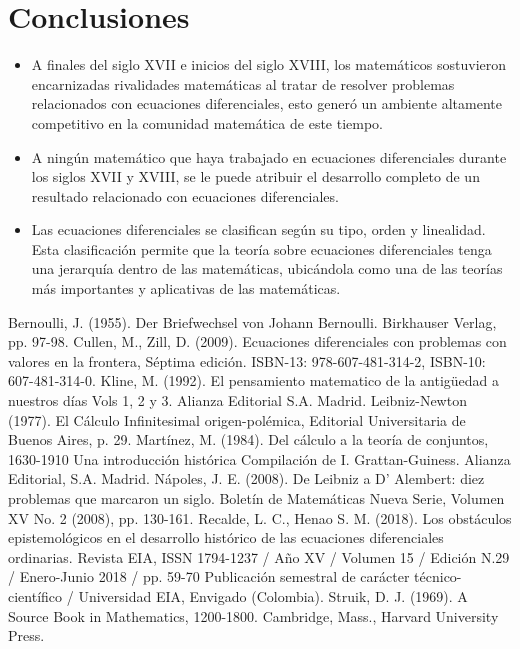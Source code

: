 \documentclass[12pt,a4paper,oneside]{book}
\begin{document}
    \chapter*{Conclusiones}
    \begin{itemize}
    	\item A finales del siglo XVII e inicios del siglo XVIII, los matemáticos sostuvieron encarnizadas rivalidades matemáticas al tratar de resolver problemas relacionados con ecuaciones diferenciales, esto generó un ambiente altamente competitivo en la comunidad matemática de este tiempo.
    	\item A ningún matemático que haya trabajado en ecuaciones diferenciales durante los siglos XVII y XVIII, se le puede atribuir el desarrollo completo de un resultado relacionado con ecuaciones diferenciales.
    	\item 	Las ecuaciones diferenciales se clasifican según su tipo, orden y linealidad. Esta clasificación permite que la teoría sobre ecuaciones diferenciales tenga una jerarquía dentro de las matemáticas, ubicándola como una de las teorías más importantes y aplicativas de las matemáticas.
    \end{itemize}
    
	
	\newpage
	\noindent
	\begin{thebibliography}{55}
		
		\bibitem{} Bernoulli, J. (1955). Der Briefwechsel von Johann Bernoulli. Birkhauser Verlag, pp. 97-98.
		\smallskip
		\bibitem{} Cullen, M., Zill, D. (2009). Ecuaciones diferenciales con problemas con valores en la frontera, Séptima edición.
		ISBN-13: 978-607-481-314-2, ISBN-10: 607-481-314-0.
		\smallskip
		\bibitem{} Kline, M. (1992). El pensamiento matematico de la antigüedad a nuestros días Vols 1, 2 y 3. Alianza Editorial S.A. Madrid.
		\smallskip
		\bibitem{} Leibniz-Newton (1977). El Cálculo Infinitesimal origen-polémica, Editorial Universitaria de Buenos Aires, p. 29.
		\smallskip
		\bibitem{} Martínez, M. (1984). Del cálculo a la teoría de conjuntos, 1630-1910 Una introducción histórica Compilación de I. Grattan-Guiness. Alianza Editorial, S.A. Madrid.
		\smallskip
		\bibitem{} Nápoles, J. E. (2008). De Leibniz a D' Alembert: diez problemas que marcaron un siglo. Boletín de Matemáticas Nueva Serie, Volumen XV No. 2 (2008), pp. 130-161.
		\smallskip
		\bibitem{} Recalde, L. C., Henao S. M. (2018). Los obstáculos epistemológicos en el desarrollo histórico de las ecuaciones diferenciales ordinarias. Revista EIA, ISSN 1794-1237 / Año XV / Volumen 15 / Edición N.29 / Enero-Junio 2018 / pp. 59-70 Publicación semestral de carácter técnico-científico / Universidad EIA, Envigado (Colombia).
		\smallskip
		\bibitem{} Struik, D. J. (1969). A Source Book in Mathematics, 1200-1800. Cambridge, Mass., Harvard University Press.
		\smallskip
	\end{thebibliography}		
\end{document}

